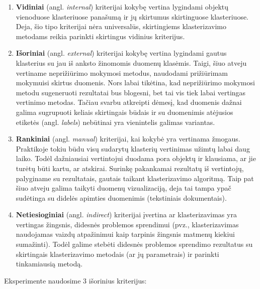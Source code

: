 \documentclass{VUMIFInfBakalaurinis}
\begin{document}
\begin{enumerate}
\def\labelenumi{\arabic{enumi}.}
\item
  \textbf{Vidiniai} (angl. \emph{internal}) kriterijai kokybę vertina
  lygindami objektų vienoduose klasteriuose panašumą ir jų skirtumus
  skirtinguose klasteriuose. Deja, šio tipo kriterijai nėra universalūs,
  skirtingiems klasterizavimo metodams reikia parinkti skirtingus
  vidinius kriterijus.
\item
  \textbf{Išoriniai} (angl. \emph{external}) kriterijai kokybę vertina
  lygindami gautus klasterius su jau iš anksto žinomomis duomenų
  klasėmis. Taigi, šiuo atveju vertiname neprižiūrimo mokymosi metodus,
  naudodami prižiūrimam mokymuisi skirtus duomenis. Nors labai tikėtina,
  kad neprižiūrimo mokymosi metodu sugeneruoti rezultatai bus blogesni,
  bet tai vis tiek labai vertingas vertinimo metodas. Tačiau svarbu
  atkreipti dėmesį, kad duomenis dažnai galima sugrupuoti keliais
  skirtingais būdais ir su duomenimis atėjusios etiketės (angl.
  \emph{labels}) nebūtinai yra vienintelis galimas variantas.
\item
  \textbf{Rankiniai} (angl. \emph{manual}) kriterijai, kai kokybė yra
  vertinama žmogaus. Praktikoje tokiu būdu visų sudarytų klasterių
  vertinimas užimtų labai daug laiko. Todėl dažniausiai vertintojui
  duodama pora objektų ir klausiama, ar jie turėtų būti kartu, ar
  atskirai. Surinkę pakankamai rezultatų iš vertintojų, palyginame su
  rezultatais, gautais taikant klasterizavimo algoritmą. Taip pat šiuo
  atveju galima taikyti duomenų vizualizaciją, deja tai tampa ypač
  sudėtinga su didelės apimties duomenimis (tekstiniais dokumentais).
\item
  \textbf{Netiesioginiai} (angl. \emph{indirect}) kriterijai įvertina ar
  klasterizavimas yra vertingas žingsnis, didesnės problemos sprendimui
  (pvz., klasterizavimas naudojamas vaizdų atpažinimui kaip tarpinis
  žingsnis matmenų kiekiui sumažinti). Todėl galime stebėti didesnės
  problemos sprendimo rezultatus su skirtingais klasterizavimo metodais
  (ar jų parametrais) ir parinkti tinkamiausią metodą.
\end{enumerate}

Eksperimente naudosime 3 išorinius kriterijus:
\end{document}
